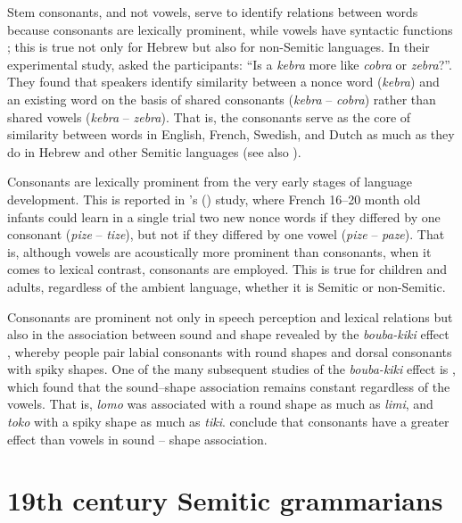 \documentclass[output=paper,
modfonts
]{LSP/langsci}
\begin{document}
Stem consonants, and not vowels, serve to identify relations between
words because consonants are lexically prominent, while vowels have
syntactic functions \citep{nespor2003a, berent2013a}; this is true not
only for Hebrew but also for non-Semitic languages. In their
experimental study, \citet{cutler2000} asked the participants: ``Is a
\emph{kebra} more like \emph{cobra} or \emph{zebra}?''. They found that
speakers identify similarity between a nonce word (\emph{kebra}) and an
existing word on the basis of shared consonants (\emph{kebra} --
\emph{cobra}) rather than shared vowels (\emph{kebra} -- \emph{zebra}).
That is, the consonants serve as the core of similarity between words in
English, French, Swedish, and Dutch as much as they do in Hebrew and
other Semitic languages (see also \citealt{vanooijen1996a, new2008a, carreiras2009a, winskel2013a}).

Consonants are lexically prominent from the very early stages of
language development. This is reported in \citeauthor{nazzi2007a}'s (\citeauthor{nazzi2007a}) study,
where French 16--20 month old infants could learn in a single trial two
new nonce words if they differed by one consonant (\emph{pize} --
\emph{tize}), but not if they differed by one vowel (\emph{pize} --
\emph{paze}). That is, although vowels are acoustically more prominent
than consonants, when it comes to lexical contrast, consonants are
employed. This is true for children and adults, regardless of the
ambient language, whether it is Semitic or non-Semitic.

Consonants are prominent not only in speech perception and lexical
relations but also in the association between sound and shape revealed
by the \emph{bouba-kiki} effect \citep{kohler1929a}, whereby people pair
labial consonants with round shapes and dorsal consonants with spiky
shapes. One of the many subsequent studies of the \emph{bouba-kiki}
effect is \citet{fort2015a}, which found that the sound--shape
association remains constant regardless of the vowels. That is,
\emph{lomo} was associated with a round shape as much as \emph{limi},
and \emph{toko} with a spiky shape as much as \emph{tiki}. \citet{fort2015a} conclude that consonants have a greater effect than vowels in
sound -- shape association.

\section{19th century Semitic grammarians}\label{th-century-semitic-grammarians}
\end{document}
